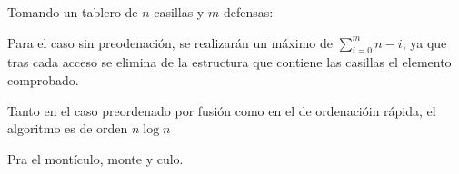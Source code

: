 Tomando un tablero de $n$ casillas y $m$ defensas:

Para el caso sin preodenación, se realizarán un máximo de $\displaystyle\sum_{i=0}^{m} n-i$, ya que tras cada acceso se elimina de la estructura que contiene las casillas el elemento comprobado.

Tanto en el caso preordenado por fusión como en el de ordenacióin rápida, el algoritmo es de orden $n \log n$

Pra el montículo, monte y culo.